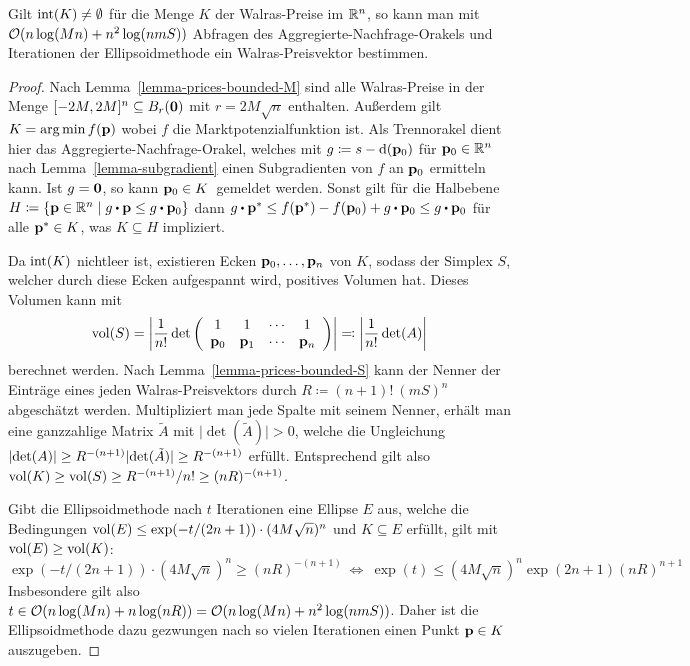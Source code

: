 \begin{theorem}
	Gilt $\operatorname{int}(K) \neq \emptyset$ für die Menge $K$ der Walras-Preise im $\mathbb{R}^n$, so kann man mit $\mathcal{O}(n\log(Mn) + n^2 \log(n m S))$ Abfragen des Aggregierte-Nachfrage-Orakels und Iterationen der Ellipsoidmethode ein Walras-Preisvektor bestimmen.
\end{theorem}
\begin{proof}
	Nach Lemma~\ref{lemma-prices-bounded-M} sind alle Walras-Preise in der Menge $[-2M, 2M]^n\subseteq B_{r}(\mathbf{0})$ mit $r = 2M\sqrt{n}$ enthalten.
	Außerdem gilt $K = \arg\min f(\mathbf{p})$ wobei $f$ die Marktpotenzialfunktion ist.
	Als Trennorakel dient hier das Aggregierte-Nachfrage-Orakel, welches mit $g \coloneqq s - \operatorname{d}(\mathbf{p}_0)$ für $\mathbf{p}_0\in\mathbb{R}^n$ nach Lemma~\ref{lemma-subgradient} einen Subgradienten von $f$ an $\mathbf{p}_0$ ermitteln kann.
	Ist $g = \mathbf{0}$, so kann \glqq$\mathbf{p}_0 \in K$\grqq\ gemeldet werden.
	Sonst gilt für die Halbebene $H\coloneqq\{ \fp\in\R^n \mid g\bcdot \fp \leq g\bcdot \fp_0 \}$ dann $g\bcdot \fp^* \leq f(\fp^*) - f(\fp_0) + g \bcdot \fp_0 \leq g \bcdot \fp_0$ für alle $\mathbf{p}^*\in K$, was $K\subseteq H$ impliziert.
	
	Da $\operatorname{int}(K)$ nichtleer ist, existieren Ecken $\mathbf{p}_0, \dots, \mathbf{p}_n$ von $K$, sodass der Simplex $S$, welcher durch diese Ecken aufgespannt wird, positives Volumen hat.
	Dieses Volumen kann mit
	\[ \operatorname{vol}(S) = \left\lvert  \frac{1}{n!} \det\left(  \begin{array}{ccccc}
		1 & 1 & \cdots & 1 \\	
		\mathbf{p}_0 & \mathbf{p}_1 & \cdots & \mathbf{p}_n
	\end{array}  \right) \right\rvert  \eqqcolon \left\lvert  \frac{1}{n!} \det(A)  \right\rvert \]
	berechnet werden.
	Nach Lemma~\ref{lemma-prices-bounded-S} kann der Nenner der Einträge eines jeden Walras-Preisvektors durch $R \coloneqq (n+1)!\ (mS)^n$ abgeschätzt werden.
	Multipliziert man jede Spalte mit seinem Nenner,
	erhält man eine ganzzahlige Matrix $\tilde{A}$ mit $\lvert \det(\tilde{A}) \rvert > 0$,
	welche die Ungleichung $\left\lvert  \det(A)  \right\rvert \geq R^{-(n+1)} \lvert \det(\tilde{A}) \rvert \geq R^{-(n+1)}$ erfüllt.
	Entsprechend gilt also $\operatorname{vol}(K) \geq \operatorname{vol}(S) \geq R^{-(n+1)} / n! \geq (nR)^{-(n+1)}$.
	
	Gibt die Ellipsoidmethode nach $t$ Iterationen eine Ellipse $E$ aus, welche die Bedingungen $\operatorname{vol}(E) \leq \exp(-t / ({2n + 1}))\cdot (4M \sqrt{n})^n$ und $K\subseteq E$ erfüllt, gilt mit $\operatorname{vol}(E) \geq \operatorname{vol}(K)$:
	\[ \exp(-t / ({2n + 1}))\cdot (4M\sqrt{n})^n \geq (nR)^{-(n+1)}
	~ \Leftrightarrow ~ \exp(t) \leq (4M\sqrt{n})^n \exp(2n+1) (nR)^{n+1} \]
	Insbesondere gilt also $t\in\mathcal{O}(n\log(Mn) + n\log(nR)) = \mathcal{O}(n\log(Mn) + n^2 \log(n m S))$.
	Daher ist die Ellipsoidmethode dazu gezwungen nach so vielen Iterationen einen Punkt $\mathbf{p}\in K$ auszugeben.
\end{proof}

